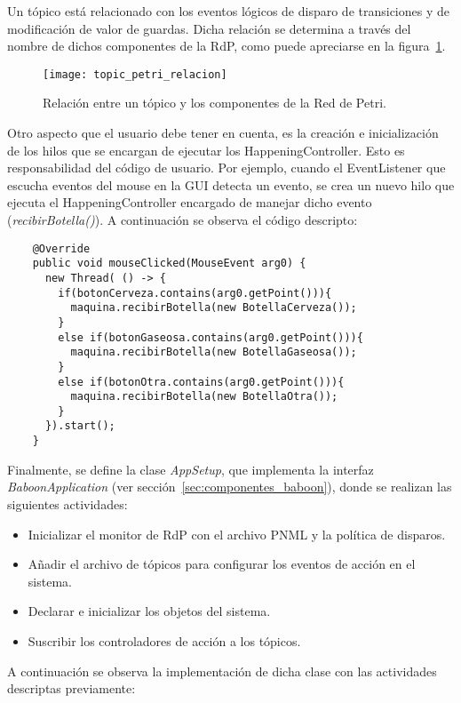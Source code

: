 Un tópico está relacionado con los eventos lógicos de
disparo de transiciones y de modificación de valor de guardas. Dicha relación
se determina a través del nombre de dichos componentes de la RdP, como
puede apreciarse en la figura~\ref{fig:topic_petri_relacion}.

\begin{figure}[H]
    \centering
    \texttt{[image: topic\_petri\_relacion]}
    \caption{Relación entre un tópico y los componentes de la Red de Petri.}
    \label{fig:topic_petri_relacion}
\end{figure}

Otro aspecto que el usuario debe tener en cuenta, es la
creación e inicialización de los hilos que se encargan de ejecutar los
HappeningController. Esto es responsabilidad del código de usuario. Por
ejemplo, cuando el EventListener que escucha eventos del mouse en la GUI
detecta un evento, se crea un nuevo hilo que ejecuta el HappeningController
encargado de manejar dicho evento (\emph{recibirBotella()}). A
continuación se observa el código descripto:

\begin{verbatim}
    @Override
    public void mouseClicked(MouseEvent arg0) {
      new Thread( () -> {
        if(botonCerveza.contains(arg0.getPoint())){
          maquina.recibirBotella(new BotellaCerveza());
        }
        else if(botonGaseosa.contains(arg0.getPoint())){
          maquina.recibirBotella(new BotellaGaseosa());
        }
        else if(botonOtra.contains(arg0.getPoint())){
          maquina.recibirBotella(new BotellaOtra());
        }
      }).start();
    }
\end{verbatim}


Finalmente, se define la clase \emph{AppSetup}, que implementa la interfaz
\emph{BaboonApplication} (ver sección~\ref{sec:componentes_baboon}), donde se
realizan las siguientes actividades:
\begin{itemize}
  \item Inicializar el monitor de RdP con el archivo PNML y la política de
  disparos.
  \item Añadir el archivo de tópicos para configurar los eventos de acción en
  el sistema.
  \item Declarar e inicializar los objetos del sistema.
  \item Suscribir los controladores de acción a los tópicos.
\end{itemize} 

A continuación se observa la implementación de dicha clase con
las actividades descriptas previamente:

